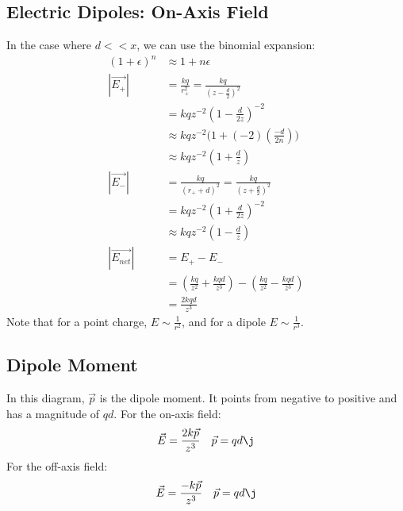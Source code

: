 \documentclass{math}
\begin{document}
\subsection*{Electric Dipoles: On-Axis Field}
\begin{center}
\end{center}
In the case where \( d << x \), we can use the binomial expansion:
\begin{align*}
  (1+\epsilon)^n &\approx 1+n\epsilon \\
  |\overrightarrow{E_{+}}| &=
    \frac{kq}{r_{+}^2} = \frac{kq}{(z-\frac{d}{2})^2} \\
  &= kqz^{-2}(1-\frac{d}{2z})^{-2} \\
  &\approx kqz^{-2}\bigg(1+(-2)(\frac{-d}{2n})\bigg) \\
  &\approx kqz^{-2}(1+\frac{d}{z}) \\
  |\overrightarrow{E_{-}}| &=
    \frac{kq}{(r_{+}+d)^2} = \frac{kq}{(z+\frac{d}{2})^2} \\
  &= kqz^{-2}(1+\frac{d}{2z})^{-2} \\
  &\approx kqz^{-2}(1-\frac{d}{z}) \\
  |\overrightarrow{E_{net}}| &= E_{+}-E_{-} \\
  &= (\frac{kq}{z^2}+\frac{kqd}{z^3})-(\frac{kq}{z^2}-\frac{kqd}{z^3}) \\
  &= \frac{2kqd}{z^3}
\end{align*}
Note that for a point charge, \( E\sim\frac{1}{r^2} \), and for a dipole
\( E\sim\frac{1}{r^3} \).

\subsection*{Dipole Moment}
\begin{center}
\end{center}
In this diagram, \( \vec{p} \) is the dipole moment. It points from negative to
positive and has a magnitude of \( qd \). For the on-axis field:
\[ \vec{E} = \frac{2k\vec{p}}{z^3} \quad \vec{p} = qd\j \]
For the off-axis field:
\[ \vec{E} = \frac{-k\vec{p}}{z^3} \quad \vec{p} = qd\j \]
\end{document}
